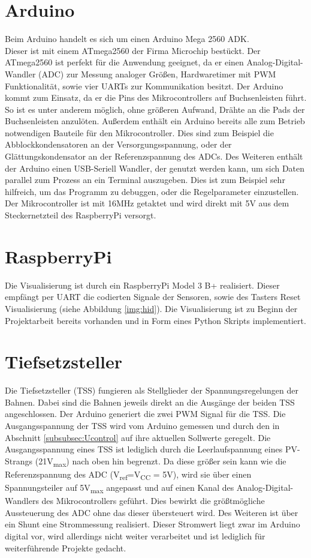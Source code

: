 \documentclass[a4paper, 11pt]{report}
\begin{document}
	\section{Arduino}
		Beim Arduino handelt es sich um einen Arduino Mega 2560 ADK.\\
		Dieser ist mit einem ATmega2560 der Firma Microchip bestückt.
		Der ATmega2560 ist perfekt für die Anwendung geeignet, da er einen Analog-Digital-Wandler (ADC) zur Messung analoger Größen, Hardwaretimer mit PWM Funktionalität, sowie  vier UARTs zur Kommunikation besitzt.
Der Arduino kommt zum Einsatz, da er die Pins des Mikrocontrollers auf Buchsenleisten führt. So ist es unter anderem möglich, ohne größeren Aufwand, Drähte an die Pads der Buchsenleisten anzulöten. Außerdem enthält ein Arduino bereits alle zum Betrieb notwendigen Bauteile für den Mikrocontroller.
Dies sind zum Beispiel die Abblockkondensatoren an der Versorgungsspannung, oder der Glättungskondensator an der Referenzspannung des ADCs.
Des Weiteren enthält der Arduino einen USB-Seriell Wandler, der genutzt werden kann, um sich Daten parallel zum Prozess an ein Terminal auszugeben.
Dies ist zum Beispiel sehr hilfreich, um das Programm zu debuggen, oder die Regelparameter einzustellen.
Der Mikrocontroller ist mit 16MHz getaktet und wird direkt mit 5V aus dem Steckernetzteil des RaspberryPi versorgt.
	\section{RaspberryPi}
		Die Visualisierung ist durch ein RaspberryPi Model 3 B+ realisiert. Dieser empfängt per UART die codierten Signale der Sensoren, sowie des Tasters \glqq Reset Visualisierung\grqq{} (siehe Abbildung \ref{img:hid}).
		Die Visualisierung ist zu Beginn der Projektarbeit bereits vorhanden und in Form eines Python Skripts implementiert.
	\section{Tiefsetzsteller}
		Die Tiefsetzsteller (TSS) fungieren als Stellglieder der Spannungsregelungen der Bahnen.
		Dabei sind die Bahnen jeweils direkt an die Ausgänge der beiden TSS angeschlossen.
	  Der Arduino generiert die zwei PWM Signal für die TSS.
		Die Ausgangsspannung der TSS wird vom Arduino gemessen und durch den in Abschnitt \ref{subsubsec:Ucontrol} auf ihre aktuellen Sollwerte geregelt.
		Die Ausgangsspannung eines TSS ist lediglich durch die Leerlaufspannung eines PV-Strangs (21V\textsubscript{max})
		nach oben hin begrenzt.
		Da diese größer sein kann wie die Referenzspannung des ADC (V\textsubscript{ref}=V\textsubscript{CC} = 5V), wird sie über einen Spannungsteiler auf 5V\textsubscript{max} angepasst und auf einen Kanal des Analog-Digital-Wandlers des Mikrocontrollers geführt. Dies bewirkt die größtmögliche Aussteuerung des ADC ohne das dieser übersteuert wird.
		Des Weiteren ist über ein Shunt eine Strommessung realisiert.
		Dieser Stromwert liegt zwar im Arduino digital vor, wird allerdings nicht weiter
		verarbeitet und ist lediglich für weiterführende Projekte gedacht.
\end{document}
